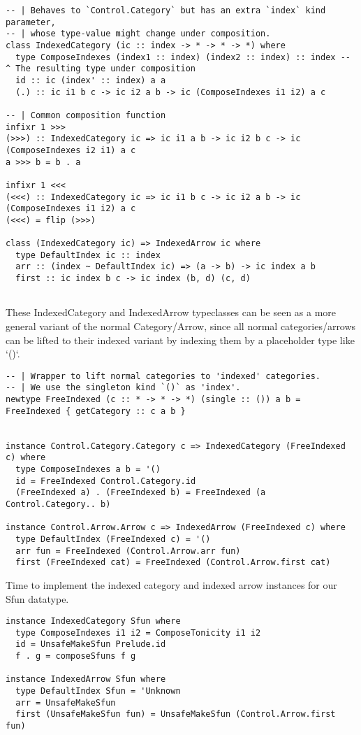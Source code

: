 \documentclass[11pt]{article}
\begin{document}
\begin{verbatim}
-- | Behaves to `Control.Category` but has an extra `index` kind parameter,
-- | whose type-value might change under composition.
class IndexedCategory (ic :: index -> * -> * -> *) where
  type ComposeIndexes (index1 :: index) (index2 :: index) :: index -- ^ The resulting type under composition
  id :: ic (index' :: index) a a
  (.) :: ic i1 b c -> ic i2 a b -> ic (ComposeIndexes i1 i2) a c

-- | Common composition function
infixr 1 >>>
(>>>) :: IndexedCategory ic => ic i1 a b -> ic i2 b c -> ic (ComposeIndexes i2 i1) a c
a >>> b = b . a

infixr 1 <<<
(<<<) :: IndexedCategory ic => ic i1 b c -> ic i2 a b -> ic (ComposeIndexes i1 i2) a c
(<<<) = flip (>>>)

class (IndexedCategory ic) => IndexedArrow ic where
  type DefaultIndex ic :: index
  arr :: (index ~ DefaultIndex ic) => (a -> b) -> ic index a b
  first :: ic index b c -> ic index (b, d) (c, d)


\end{verbatim}

These IndexedCategory and IndexedArrow typeclasses can be seen as a more general variant of the normal Category/Arrow, 
since all normal categories/arrows can be lifted to their indexed variant by indexing them by a placeholder type like `()`.

\begin{verbatim}
-- | Wrapper to lift normal categories to 'indexed' categories.
-- | We use the singleton kind `()` as 'index'.
newtype FreeIndexed (c :: * -> * -> *) (single :: ()) a b = FreeIndexed { getCategory :: c a b }


instance Control.Category.Category c => IndexedCategory (FreeIndexed c) where
  type ComposeIndexes a b = '()
  id = FreeIndexed Control.Category.id
  (FreeIndexed a) . (FreeIndexed b) = FreeIndexed (a Control.Category.. b)

instance Control.Arrow.Arrow c => IndexedArrow (FreeIndexed c) where
  type DefaultIndex (FreeIndexed c) = '()
  arr fun = FreeIndexed (Control.Arrow.arr fun)
  first (FreeIndexed cat) = FreeIndexed (Control.Arrow.first cat)

\end{verbatim}

Time to implement the indexed category and indexed arrow instances for our Sfun datatype.

\begin{verbatim}
instance IndexedCategory Sfun where
  type ComposeIndexes i1 i2 = ComposeTonicity i1 i2
  id = UnsafeMakeSfun Prelude.id
  f . g = composeSfuns f g

instance IndexedArrow Sfun where
  type DefaultIndex Sfun = 'Unknown
  arr = UnsafeMakeSfun
  first (UnsafeMakeSfun fun) = UnsafeMakeSfun (Control.Arrow.first fun)

\end{verbatim}
\end{document}
